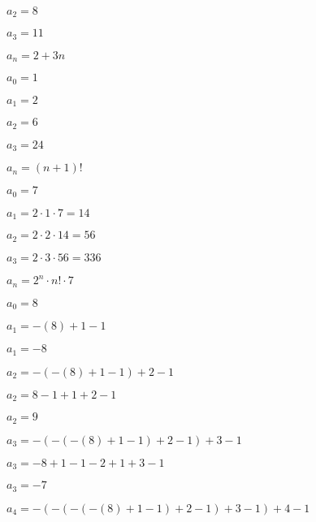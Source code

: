 \documentclass{exam}
\begin{document}
\begin{questions}
\begin{subparts}
\begin{center}
\(a_2 = 8\)

\(a_3 = 11\)

\(a_n = 2 + 3n\)

\end{center}


\begin{center}

\(a_0 = 1\)

\(a_1 = 2\)

\(a_2 = 6\)

\(a_3 = 24\)

\(a_n = (n+1)!\)

\end{center}


\begin{center}

\(a_0 = 7\)

\(a_1 = 2 \cdot 1 \cdot 7 = 14\)

\(a_2 = 2 \cdot 2 \cdot 14 = 56\)

\(a_3 = 2 \cdot 3 \cdot 56 = 336\)

\(a_n = 2^n \cdot n! \cdot 7 \)

\end{center}



\begin{center}

\(a_0 = 8\)
\vspace{5px}

\(a_1 = -(8) + 1 - 1\)

\(a_1 = -8\)
\vspace{5px}

\(a_2 = -(-(8) + 1 - 1) + 2 - 1 \)

\(a_2 = 8 - 1 + 1 + 2 - 1 \)

\(a_2 = 9\)
\vspace{5px}

\(a_3 = -(-(-(8) + 1 - 1) + 2 - 1) + 3 - 1 \)

\(a_3 = -8 + 1 - 1 - 2 + 1 + 3 - 1\)

\(a_3 = -7\)
\vspace{5px}

\(a_4 = -(-(-(-(8) + 1 - 1) + 2 - 1) + 3 - 1) + 4 - 1 \)


\end{center}
\end{subparts}
\end{questions}
\end{document}
